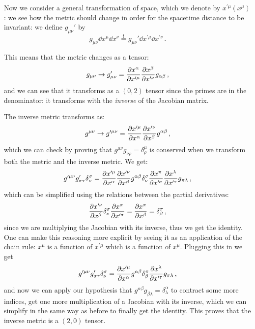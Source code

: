 \documentclass[main.tex]{subfiles}
\begin{document}
Now we consider a general transformation of space, which we denote by \(x^{\prime \mu } (x^{\mu })\): we see how the metric should change in order for the spacetime distance to be invariant: we define \(g_{\mu \nu }'\) by 
%
\begin{equation}
    g_{\mu \nu } \dd{x^{\mu }} \dd{x^{\nu }}
    \overset{!}{=}  
    g_{\mu \nu }' \dd{x^{\prime \mu }} \dd{x^{\prime \nu }}
\,.
\end{equation}
%

This means that the metric changes as a tensor: 
%
\begin{equation}
  g_{\mu \nu } \rightarrow
  g_{\mu \nu }' = 
  \pdv{x^{ \alpha }}{x^{\prime \mu }} 
  \pdv{x^{ \beta  }}{x^{\prime \nu  }} 
  g_{\alpha \beta }
\,,
\end{equation}
%
and we can see that it transforms as a \((0,2)\) tensor since the primes are in the denominator: it transforms with the \emph{inverse} of the Jacobian matrix.

The inverse metric transforms as: 
%
\begin{equation}
  g^{\mu \nu } \rightarrow
  g^{\prime \mu \nu } =
  \pdv{x^{\prime \mu  }}{x^{\alpha  }} 
  \pdv{x^{\prime \nu   }}{x^{\beta }}
  g^{\alpha \beta } 
\,,
\end{equation}
%
which we can check by proving that \(g^{\mu \nu }g_{\nu \rho  } = \delta^{\mu }_{\rho }\) is conserved when we transform both the metric and the inverse metric. We get: 
%
\begin{equation}
    g^{\prime \mu \nu } g_{\sigma \tau  }' \delta_{\nu }^{\sigma } =
    \pdv{x^{\prime \mu  }}{x^{\alpha  }} 
    \pdv{x^{\prime \nu   }}{x^{\beta }}
    g^{\alpha \beta } 
    \delta_{\nu }^{\sigma }
    \pdv{x^{ \pi  }}{x^{\prime \sigma  }} 
    \pdv{x^{ \lambda   }}{x^{\prime \tau  }} 
    g_{\pi  \lambda  }
\,,
\end{equation}
%
which can be simplified using the relations between the partial derivatives: 
%
\begin{equation}
    \pdv{x^{\prime \nu   }}{x^{\beta }}
    \delta_{\nu }^{\sigma }
    \pdv{x^{ \pi  }}{x^{\prime \sigma  }} 
    = \pdv{x^{\pi }}{x^{\beta }}
    = \delta^{\pi }_{\beta }
\,,
\end{equation}
%
since we are multiplying the Jacobian with its inverse, thus we get the identity. One can make this reasoning more explicit by seeing it as an application of the chain rule: \(x^{\mu }\) is a function of \(x^{\prime \mu }\) which is a function of \(x^{\mu } \).
Plugging this in we get 
%
\begin{equation}
    g^{\prime \mu \nu } g_{\sigma \tau  }' \delta_{\nu }^{\sigma } =
    \pdv{x^{\prime \mu  }}{x^{\alpha  }} 
    g^{\alpha \beta } 
    \delta^{\pi }_{\beta }
    \pdv{x^{ \lambda   }}{x^{\prime \tau  }} 
    g_{\pi  \lambda  }
\,,
\end{equation}
%
and now we can apply our hypothesis that \(g^{\alpha \beta }g_{\beta \lambda } = \delta^{\alpha }_{\lambda }\) to contract some more indices, get one more multiplication of a Jacobian with its inverse, which we can simplify in the same way as before to finally get the identity.
This proves that the inverse metric is a \((2,0)\) tensor.
\end{document}
